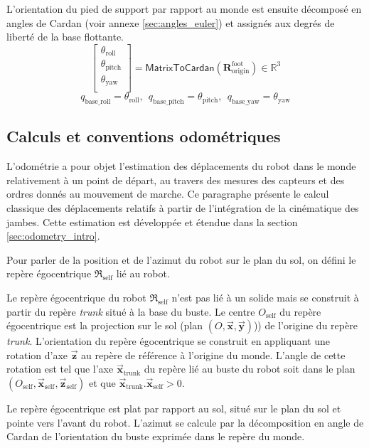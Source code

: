 \begin{itemize}
$$        $$
        L'orientation du pied de support par rapport au monde est ensuite décomposé 
        en angles de Cardan (voir annexe \ref{sec:angles_euler}) et
        assignés aux degrés de liberté de la base flottante.
        $$
        \begin{bmatrix}
        \theta_{\text{roll}} \\
        \theta_{\text{pitch}} \\
        \theta_{\text{yaw}} \\
        \end{bmatrix}
        =
        \mathsf{MatrixToCardan}(\bm{R}_{\text{origin}}^{\text{foot}})
        \in \mathbb{R}^3
        $$
        $$
        q_{\text{base\_roll}} = \theta_{\text{roll}},~~
        q_{\text{base\_pitch}} = \theta_{\text{pitch}},~~ 
        q_{\text{base\_yaw}} = \theta_{\text{yaw}}
        $$
\end{itemize}

\subsection{Calculs et conventions odométriques\label{sec:def_odometry}}

L'odométrie a pour objet l'estimation 
des déplacements du robot dans le monde relativement 
à un point de départ, au travers des mesures des capteurs
et des ordres donnés au mouvement de marche.
Ce paragraphe présente le calcul classique des déplacements
relatifs à partir de l'intégration de la cinématique des jambes.
Cette estimation est développée et étendue dans la section \ref{sec:odometry_intro}.

Pour parler de la position et de l'azimut du robot sur le plan du sol,
on défini le repère égocentrique $\mathfrak{R}_{\text{self}}$ lié au robot.

\begin{definition}
Le repère égocentrique du robot $\mathfrak{R}_{\text{self}}$
n'est pas lié à un solide mais se construit à partir du repère
\textit{trunk} situé à la base du buste.
Le centre $O_{\text{self}}$ du repère égocentrique est la projection
sur le sol (plan $(O,\bm{\vec{x}},\bm{\vec{y}})$)) 
de l'origine du repère \textit{trunk}.
L'orientation du repère égocentrique se construit en appliquant
une rotation d'axe $\bm{\vec{z}}$ au repère de référence 
à l'origine du monde.
L'angle de cette rotation est tel que l'axe $\bm{\vec{x}}_{\text{trunk}}$ du repère lié au buste du robot
soit dans le plan $(O_{\text{self}}, \bm{\vec{x}}_{\text{self}}, \bm{\vec{z}}_{\text{self}})$ 
et que $\bm{\vec{x}}_{\text{trunk}}.\bm{\vec{x}}_{\text{self}} > 0$.
\end{definition}
Le repère égocentrique est \og plat \fg par rapport au sol, situé sur le plan du sol 
et pointe vers l'avant du robot. L'azimut se calcule par la décomposition en angle
de Cardan de l'orientation du buste exprimée dans le repère du monde.\\

